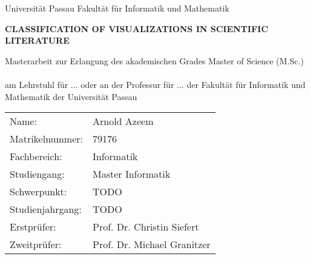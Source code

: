 \begin{titlepage}
	Universität Passau\newline
	Fakultät für Informatik und Mathematik
	\vspace{2.5cm}
    \begin{center}
    \LARGE\textbf{\textsc{CLASSIFICATION  OF VISUALIZATIONS  IN SCIENTIFIC LITERATURE}}\\
   
    \normalsize

    \vspace{2.5cm}
    \end{center}

 \normalsize{
 	Masterarbeit zur Erlangung des akademischen Grades\newline
 	Master of Science (M.Sc.)\newline
 	\ \\
 	am Lehrstuhl für ... oder an der Professur für ... \newline
 	der Fakultät für Informatik und Mathematik\newline
 	der Universität Passau\newline

    \begin{tabular}{ll}
    	Name: & Arnold Azeem \\
    	Matrikelnummer: & 79176 \\
    	Fachbereich: & Informatik\\
    	Studiengang: & Master Informatik\\
    	Schwerpunkt: & TODO \\
    	Studienjahrgang: & TODO \\
	Erstprüfer: & Prof. Dr. Christin Siefert \\
	Zweitprüfer: & Prof. Dr. Michael Granitzer\\
    \end{tabular}\\
    }


\end{titlepage}